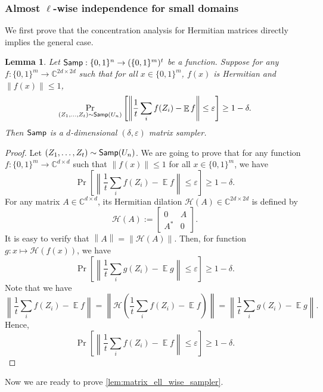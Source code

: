 \documentclass[11pt,letterpaper]{article}
\newtheorem{lemma}[theorem]{Lemma}
\newcommand{\C}{\mathbb{C}}
\DeclareMathOperator*{\E}{\mathbb{E}}
\newcommand{\eps}{\varepsilon}
\newcommand{\1}{\mathbbm{1}}
\newcommand{\norm}[1]{\left\lVert #1\right\rVert}
\newcommand{\tuple}[1]{\left(#1\right)}
\newcommand{\zo}{\{0, 1\}}
\newcommand{\Smp}{\textup{\textsf{Samp}}}
\begin{document}
\subsubsection{Almost $\ell$-wise independence for small domains}
We first prove that the concentration analysis for Hermitian matrices directly implies the general case.
\begin{lemma}    \label{lem:Hermitian_implies_general}
    Let $\Smp: \zo^n \to (\zo^m)^t$ be a function. Suppose for any $f: \zo^m \to \C^{2d\times 2d}$ such that for all $x \in \zo^m$, $f(x)$ is Hermitian and $\|f(x)\| \le 1$,     \[
    \Pr_{(Z_1, \dots, Z_t) \sim \Smp(U_n)}
    \left[ \norm{\frac{1}{t}  \sum_i f(Z_i) - \E f} \leq \varepsilon \right]
    \geq 1 - \delta.
    \]
    Then $\Smp$ is a $d$-dimensional $(\delta, \eps)$ matrix sampler.
\end{lemma}

\begin{proof}
    Let $(Z_1, \dots, Z_t) \sim \Smp(U_n)$.
    We are going to prove that for any function $f : \zo^m \to \C^{d \times d}$ such that $\|f(x)\| \leq 1$ for all $x \in \zo^m$, we have
    \[
    \Pr
    \left[ \norm{\frac{1}{t}  \sum_i f(Z_i) - \E f} \leq \varepsilon \right]
    \geq 1 - \delta.
    \]
    For any matrix $A \in \C^{d \times d}$, its Hermitian dilation $\mathcal{H}(A) \in \C^{2d \times 2d}$ is defined by \[
        \mathcal{H}(A) := \begin{bmatrix}
        0 & A \\
        A^* & 0
        \end{bmatrix}.
    \]
    It is easy to verify that $\norm{A} = \norm{\mathcal{H}(A)}$. Then, for function $g : x \mapsto \mathcal{H}(f(x))$, we have
        \[
    \Pr
    \left[ \norm{\frac{1}{t}  \sum_i g(Z_i) - \E g} \leq \varepsilon \right]
    \geq 1 - \delta.
    \]
    Note that we have \[
    \norm{\frac{1}{t}  \sum_i f(Z_i) - \E f} = \norm{\mathcal{H}\tuple{\frac{1}{t}  \sum_i f(Z_i) - \E f}} = \norm{\frac{1}{t}  \sum_i g(Z_i) - \E g}.
    \]
    Hence, \[
        \Pr
    \left[ \norm{\frac{1}{t}  \sum_i f(Z_i) - \E f} \leq \varepsilon \right]
    \geq 1 - \delta.
    \]
\end{proof}

Now we are ready to prove \cref{lem:matrix_ell_wise_sampler}. 
\matrixEllWiseSampler*
\end{document}

